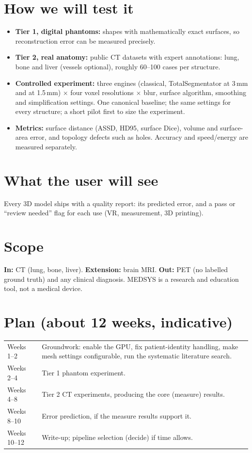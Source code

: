 \documentclass[10pt,a4paper]{article}
\begin{document}
\section{How we will test it}
\begin{itemize}
\item \textbf{Tier 1, digital phantoms:} shapes with mathematically exact surfaces, so reconstruction error can be measured precisely.
\item \textbf{Tier 2, real anatomy:} public CT datasets with expert annotations: lung, bone and liver (vessels optional), roughly 60--100 cases per structure.
\item \textbf{Controlled experiment:} three engines (classical, TotalSegmentator at 3\,mm and at 1.5\,mm) $\times$ four voxel resolutions $\times$ blur, surface algorithm, smoothing and simplification settings. One canonical baseline; the same settings for every structure; a short pilot first to size the experiment.
\item \textbf{Metrics:} surface distance (ASSD, HD95, surface Dice), volume and surface-area error, and topology defects such as holes. Accuracy and speed/energy are measured separately.
\end{itemize}

\section{What the user will see}
Every 3D model ships with a quality report: its predicted error, and a pass or ``review needed'' flag for each use (VR, measurement, 3D printing).

\section{Scope}
\textbf{In:} CT (lung, bone, liver). \textbf{Extension:} brain MRI. \textbf{Out:} PET (no labelled ground truth) and any clinical diagnosis. MEDSYS is a research and education tool, not a medical device.

\section{Plan (about 12 weeks, indicative)}
\begin{tabular}{@{}p{2.3cm}p{14cm}@{}}
Weeks 1--2 & Groundwork: enable the GPU, fix patient-identity handling, make mesh settings configurable, run the systematic literature search. \\
Weeks 2--4 & Tier 1 phantom experiment. \\
Weeks 4--8 & Tier 2 CT experiments, producing the core (measure) results. \\
Weeks 8--10 & Error prediction, if the measure results support it. \\
Weeks 10--12 & Write-up; pipeline selection (decide) if time allows. \\
\end{tabular}
\end{document}
